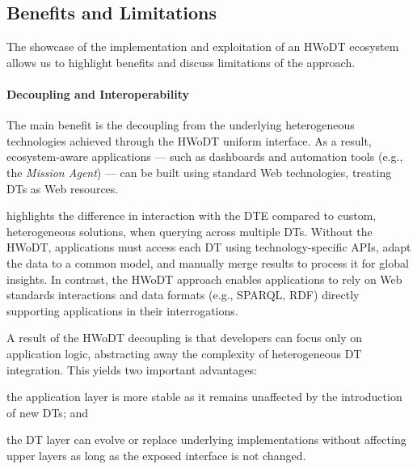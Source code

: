 % 

\subsection{Benefits and Limitations}
\label{ssec:benefits-limitations}


The showcase of the implementation and exploitation of an \ac{HWoDT} ecosystem allows us to highlight benefits and discuss limitations of the approach.

\paragraph{Decoupling and Interoperability}
The main benefit is the decoupling from the underlying heterogeneous technologies achieved through the \ac{HWoDT} uniform interface.
%
As a result, ecosystem-aware applications — such as dashboards and automation tools (e.g., the \emph{Mission Agent}) — can be built using standard Web technologies, treating \acp{DT} as Web resources.

 highlights the difference in interaction with the \ac{DTE} compared to custom, heterogeneous solutions, when querying across multiple \acp{DT}.
%
Without the \ac{HWoDT}, applications must access each \ac{DT} using technology-specific \acp{API}, adapt the data to a common model, and manually merge results to process it for global insights.
In contrast, the \ac{HWoDT} approach enables applications to rely on Web standards interactions and data formats (e.g., SPARQL, \ac{RDF}) directly supporting applications in their interrogations.


A result of the \ac{HWoDT} decoupling is that developers can focus only on application logic, abstracting away the complexity of heterogeneous \ac{DT} integration.  
This yields two important advantages:  
\begin{inlinelist}
    \item the application layer is more stable as it remains unaffected by the introduction of new \acp{DT};
    and  
    \item the \ac{DT} layer can evolve or replace underlying implementations without affecting upper layers as long as the exposed interface is not changed.
\end{inlinelist}

